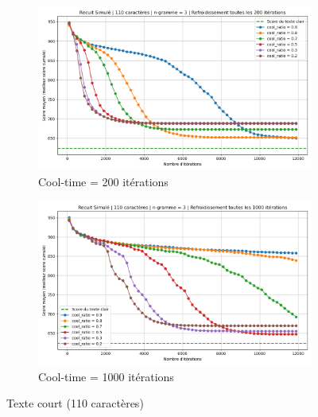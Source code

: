 \documentclass[a4paper]{article}
\begin{document}
\begin{figure}[H]
    \centering
    \begin{subfigure}[b]{0.49\textwidth}
        \includegraphics[width=\textwidth]{graphe_recuit_n_3_110_cool_time_200.png}
        \caption{Cool-time = 200 itérations}
        \label{fig:n3-110-200}
    \end{subfigure}
    \hfill
    \begin{subfigure}[b]{0.49\textwidth}
        \includegraphics[width=\textwidth]{graphe_recuit_n_3_110_cool_time_1000.png}
        \caption{Cool-time = 1000 itérations}
        \label{fig:n3-509-200}
    \end{subfigure}
    \caption{Texte court (110 caractères)}
    \label{fig:rs-n3-110}
\end{figure}
\end{document}
